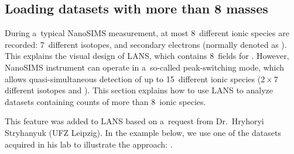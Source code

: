 \subsection{Loading datasets with more than 8 masses}
\setcounter{step}{0}

\goldbox{}
During a~typical NanoSIMS measurement, at most 8~different ionic species are recorded: 7~different isotopes, and secondary electrons (normally denoted as ). This explains the visual design of LANS, which contains 8~fields for . However, NanoSIMS instrument can operate in a~so-called peak-switching mode, which allows quasi-simultaneous detection of up to 15~different ionic species ($2\times 7$ different isotopes and ). This section explains how to use LANS to analyze datasets containing counts of more than 8~ionic species.
\tcbe

\noindent
This feature was added to LANS based on a~request from Dr.~Hryhoryi Stryhanyuk (UFZ Leipzig). In the example below, we use one of the datasets acquired in his lab to illustrate the approach: .

\baselineskip





